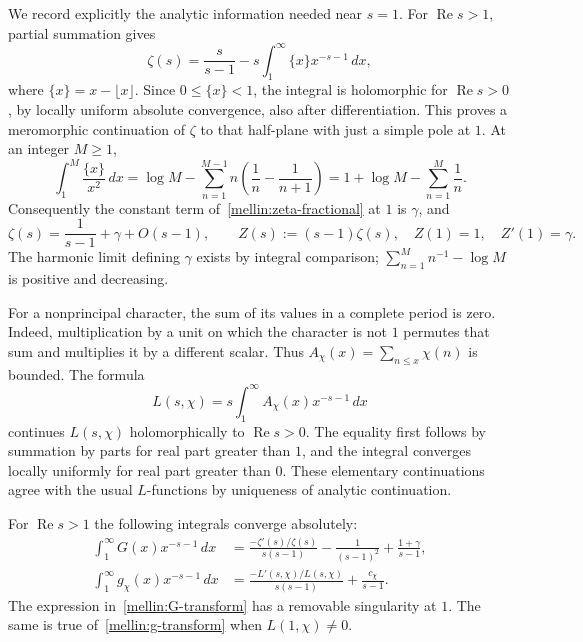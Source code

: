 We record explicitly the analytic information needed near $s=1$.
For $\operatorname{Re}s>1$, partial summation gives
\begin{equation}\label{mellin:zeta-fractional}
 \zeta(s)=\frac{s}{s-1}
       -s\int_1^\infty\{x\}x^{-s-1}\,dx,
\end{equation}
where $\{x\}=x-\lfloor x\rfloor$.  Since $0\leq\{x\}<1$, the
integral is holomorphic for $\operatorname{Re}s>0$, by locally uniform
absolute convergence, also after differentiation.  This proves a
meromorphic continuation of $\zeta$ to that half-plane with just a simple
pole at $1$.  At an integer $M\geq1$,
\[
 \int_1^M\frac{\{x\}}{x^2}\,dx
   =\log M-\sum_{n=1}^{M-1}n\left(\frac1n-\frac1{n+1}\right)
   =1+\log M-\sum_{n=1}^M\frac1n.
\]
Consequently the constant term of~\eqref{mellin:zeta-fractional} at
$1$ is $\gamma$, and
\begin{equation}\label{mellin:zeta-laurent}
 \zeta(s)=\frac1{s-1}+\gamma+O(s-1),\qquad
 Z(s):=(s-1)\zeta(s),\quad Z(1)=1,\quad Z'(1)=\gamma.
\end{equation}
The harmonic limit defining $\gamma$ exists by integral comparison;
$\sum_{n=1}^M n^{-1}-\log M$ is positive and decreasing.

For a nonprincipal character, the sum of its values in a complete period
is zero.  Indeed, multiplication by a unit on which the character is
not $1$ permutes that sum and multiplies it by a different scalar.
Thus $A_\chi(x)=\sum_{n\leq x}\chi(n)$ is bounded.  The formula
\begin{equation}\label{mellin:dirichlet-continuation}
 L(s,\chi)=s\int_1^\infty A_\chi(x)x^{-s-1}\,dx
\end{equation}
continues $L(s,\chi)$ holomorphically to $\operatorname{Re}s>0$.
The equality first follows by summation by parts for real part greater
than $1$, and the integral converges locally uniformly for real part
greater than $0$.  These elementary continuations agree with the usual
$L$-functions by uniqueness of analytic continuation.

\begin{lemma}\label{mellin:identities}
For $\operatorname{Re}s>1$ the following integrals converge absolutely:
\begin{align}
 \int_1^\infty G(x)x^{-s-1}\,dx
 &=\frac{-\zeta'(s)/\zeta(s)}{s(s-1)}
     -\frac1{(s-1)^2}+\frac{1+\gamma}{s-1},\label{mellin:G-transform}\\
 \int_1^\infty g_\chi(x)x^{-s-1}\,dx
 &=\frac{-L'(s,\chi)/L(s,\chi)}{s(s-1)}
     +\frac{c_\chi}{s-1}.\label{mellin:g-transform}
\end{align}
The expression in~\eqref{mellin:G-transform} has a removable singularity
at $1$.  The same is true of~\eqref{mellin:g-transform} when
$L(1,\chi)\neq0$.
\end{lemma}

